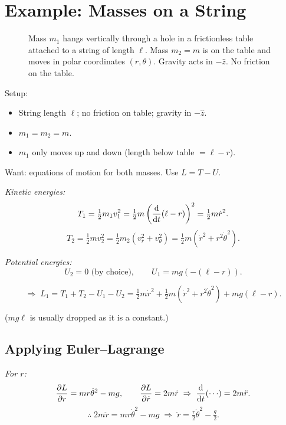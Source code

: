 \section{Example: Masses on a String}

\begin{figure}[H]
    \centering
    \caption{Mass $m_1$ hangs vertically through a hole in a frictionless table
    attached to a string of length $\ell$. Mass $m_2 = m$ is on the table and moves
    in polar coordinates $(r,\theta)$. Gravity acts in $-\hat{z}$. No friction on
    the table.}
\end{figure}

Setup:
\begin{itemize}
    \item String length $\ell$; no friction on table; gravity in $-\hat{z}$.
    \item $m_1 = m_2 = m$.
    \item $m_1$ only moves up and down (length below table $= \ell - r$).
\end{itemize}

Want: equations of motion for both masses.  Use $L = T - U$.

\textit{Kinetic energies:}
\[
    T_1 = \tfrac{1}{2}m_1 v_1^2 = \tfrac{1}{2}m\left(\dv{t}(\ell - r)\right)^2
        = \tfrac{1}{2}m\dot{r}^2.
\]
\[
    T_2 = \tfrac{1}{2}mv_2^2 = \tfrac{1}{2}m_2(v_r^2 + v_\theta^2)
        = \tfrac{1}{2}m(\dot{r}^2 + r^2\dot{\theta}^2).
\]

\textit{Potential energies:}
\[
    U_2 = 0 \text{ (by choice)}, \qquad U_1 = mg(-(\ell - r)).
\]

\[
    \Rightarrow\; L_1 = T_1 + T_2 - U_1 - U_2
    = \tfrac{1}{2}m\dot{r}^2 + \tfrac{1}{2}m(\dot{r}^2 + r^2\dot{\theta}^2) + mg(\ell - r).
\]

($mg\ell$ is usually dropped as it is a constant.)

\subsection{Applying Euler--Lagrange}

\textit{For $r$:}
\[
    \frac{\partial L}{\partial r} = mr\dot{\theta}^2 - mg, \qquad
    \frac{\partial L}{\partial \dot{r}} = 2m\dot{r}
    \;\Rightarrow\; \dv{t}(\cdots) = 2m\ddot{r}.
\]
\[
    \therefore\; 2m\ddot{r} = mr\dot{\theta}^2 - mg
    \;\Rightarrow\; \boxed{\ddot{r} = \tfrac{r}{2}\dot{\theta}^2 - \tfrac{g}{2}.}
\]

